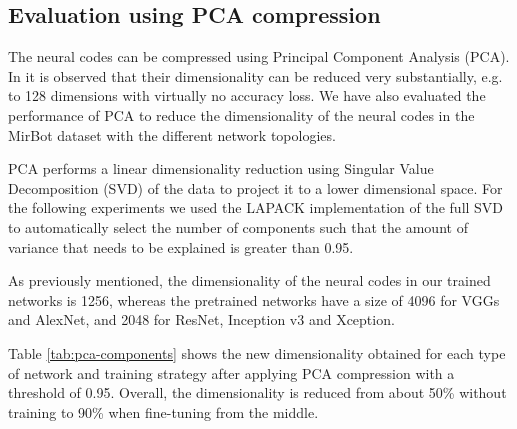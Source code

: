 \documentclass[final, twocolumn]{elsarticle}
\begin{document}
\subsection{Evaluation using PCA compression}
\label{sec:pca}

The neural codes can be compressed using Principal Component Analysis (PCA). In \cite{BabenkoSCL14} it is observed that their dimensionality can be reduced very substantially, e.g. to 128 dimensions with virtually no accuracy loss. We have also evaluated the performance of PCA to reduce the dimensionality of the neural codes in the MirBot dataset with the different network topologies.


PCA performs a linear dimensionality reduction using Singular Value Decomposition (SVD) of the data to project it to a lower dimensional space. For the following experiments we used the LAPACK implementation of the full SVD to automatically select the number of components such that the amount of variance that needs to be explained is greater than 0.95.



As previously mentioned, the dimensionality of the neural codes in our trained networks is 1256, whereas the pretrained networks have a size of 4096 for VGGs and AlexNet, and 2048 for ResNet, Inception v3 and Xception.

Table \ref{tab:pca-components} shows the new dimensionality obtained for each type of network and training strategy after applying PCA compression with a threshold of 0.95.
Overall, the dimensionality is reduced from about  50\% without training to 90\% when fine-tuning from the middle.
%
\end{document}
